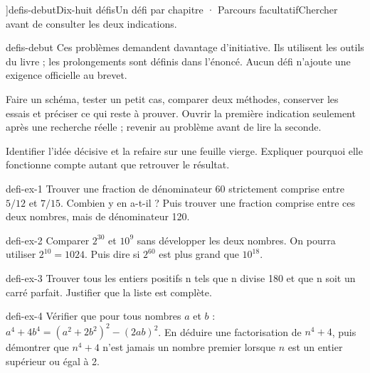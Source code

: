 \editionPage[\pdfbookmark[0]{Défis d’approfondissement}{bm-defis-debut-parent}]{defis-debut}{Dix-huit défis}{Un défi par chapitre · Parcours facultatif}{Chercher avant de consulter les deux indications.}
\begin{blocEdition}{defis-debut}
Ces problèmes demandent davantage d’initiative. Ils utilisent les outils du livre ; les prolongements sont définis dans l’énoncé. Aucun défi n’ajoute une exigence officielle au brevet.\par\bigskip
\begin{savoirfaire}Faire un schéma, tester un petit cas, comparer deux méthodes, conserver les essais et préciser ce qui reste à prouver. Ouvrir la première indication seulement après une recherche réelle ; revenir au problème avant de lire la seconde.\end{savoirfaire}
\begin{savoirfaire}Identifier l’idée décisive et la refaire sur une feuille vierge. Expliquer pourquoi elle fonctionne compte autant que retrouver le résultat.\end{savoirfaire}
\end{blocEdition}
\begin{blocEdition}{defi-ex-1}
Trouver une fraction de dénominateur 60 strictement comprise entre $5/12$ et $7/15$. Combien y en a-t-il ? Puis trouver une fraction comprise entre ces deux nombres, mais de dénominateur 120.
\end{blocEdition}
\begin{blocEdition}{defi-ex-2}
Comparer $2^{30}$ et $10^9$ sans développer les deux nombres. On pourra utiliser $2^{10}=1024$. Puis dire si $2^{60}$ est plus grand que $10^{18}$.
\end{blocEdition}
\begin{blocEdition}{defi-ex-3}
Trouver tous les entiers positifs n tels que n divise 180 et que n soit un carré parfait. Justifier que la liste est complète.
\end{blocEdition}
\begin{blocEdition}{defi-ex-4}
Vérifier que pour tous nombres $a$ et $b$ : $a^4+4b^4=(a^2+2b^2)^2-(2ab)^2$. En déduire une factorisation de $n^4+4$, puis démontrer que $n^4+4$ n’est jamais un nombre premier lorsque $n$ est un entier supérieur ou égal à 2.
\end{blocEdition}
